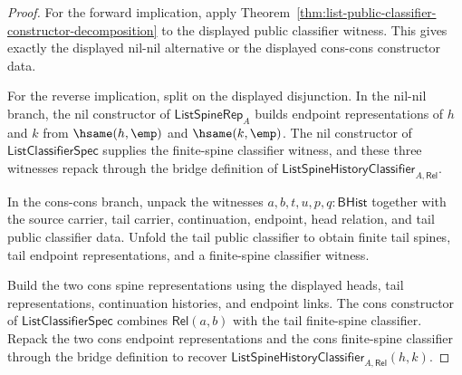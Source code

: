 \begin{proof}
For the forward implication, apply
Theorem~\ref{thm:list-public-classifier-constructor-decomposition} to the
displayed public classifier witness. This gives exactly the displayed nil-nil
alternative or the displayed cons-cons constructor data.

For the reverse implication, split on the displayed disjunction. In the nil-nil
branch, the nil constructor of $\mathsf{ListSpineRep}_A$ builds endpoint
representations of $h$ and $k$ from $\hsame(h,\emp)$ and $\hsame(k,\emp)$. The
nil constructor of $\mathsf{ListClassifierSpec}$ supplies the finite-spine
classifier witness, and these three witnesses repack through the bridge
definition of $\mathsf{ListSpineHistoryClassifier}_{A,\mathsf{Rel}}$.

In the cons-cons branch, unpack the witnesses
$a,b,t,u,p,q:\mathsf{BHist}$ together with the source carrier, tail carrier,
continuation, endpoint, head relation, and tail public classifier data. Unfold
the tail public classifier to obtain finite tail spines, tail endpoint
representations, and a finite-spine classifier witness.

Build the two cons spine representations using the displayed heads, tail
representations, continuation histories, and endpoint links. The cons constructor
of $\mathsf{ListClassifierSpec}$ combines $\mathsf{Rel}(a,b)$ with the tail
finite-spine classifier. Repack the two cons endpoint representations and the
cons finite-spine classifier through the bridge definition to recover
$\mathsf{ListSpineHistoryClassifier}_{A,\mathsf{Rel}}(h,k)$.
\end{proof}

